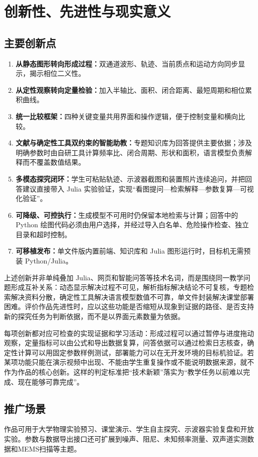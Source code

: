 \documentclass[UTF8,a4paper,zihao=-4]{ctexart}
\begin{document}
\section{创新性、先进性与现实意义}

\subsection{主要创新点}
\begin{enumerate}
  \item \textbf{从静态图形转向形成过程：}双通道波形、轨迹、当前质点和运动方向同步显示，揭示相位二义性。
  \item \textbf{从定性观察转向定量检验：}加入半轴比、面积、闭合距离、最短周期和相位累积曲线。
  \item \textbf{统一比较框架：}四种关键变量共用界面和操作逻辑，便于控制变量和横向比较。
  \item \textbf{文献与确定性工具双约束的智能助教：}专题知识库为回答提供主要依据；涉及明确参数时由自研工具计算频率比、闭合周期、形状和面积，语言模型负责解释而不覆盖数值结果。
  \item \textbf{多模态探究闭环：}学生可粘贴轨迹、示波器截图和装置照片连续追问，并把回答建议直接带入 Julia 实验验证，实现“看图提问—检索解释—参数复算—可视化验证”。
  \item \textbf{可降级、可控执行：}生成模型不可用时仍保留本地检索与计算；回答中的 Python 绘图代码必须由用户选择，并经过导入白名单、危险操作检查、独立目录和超时控制。
  \item \textbf{可移植发布：}单文件版内置前端、知识库和 Julia 图形运行时，目标机无需预装 Python/Julia。
\end{enumerate}

上述创新并非单纯叠加 Julia、网页和智能问答等技术名词，而是围绕同一教学问题形成互补关系：动态显示解决过程不可见，解析指标解决结论不可复核，专题检索解决资料分散，确定性工具解决语言模型数值不可靠，单文件封装解决课堂部署困难。评价作品先进性时，应以这些功能是否缩短从现象到证据的路径、是否支持新的探究任务为判断依据，而不是以界面元素数量为依据。

每项创新都对应可检查的实现证据和学习活动：形成过程可以通过暂停与进度拖动观察，定量指标可以由公式和导出数据复算，问答依据可以通过检索日志核查，确定性计算可以用固定参数样例测试，部署能力可以在无开发环境的目标机验证。若某项功能只能在演示视频中出现、不能由学生重复操作或不能说明数据来源，就不作为作品的核心创新。这样的判定标准把“技术新颖”落实为“教学任务以前难以完成、现在能够可靠完成”。

\subsection{推广场景}
作品可用于大学物理实验预习、课堂演示、学生自主探究、示波器实验复盘和开放实验。参数与数据导出接口还可扩展到噪声、阻尼、未知频率测量、双声道实测数据和MEMS扫描等主题。
\end{document}
